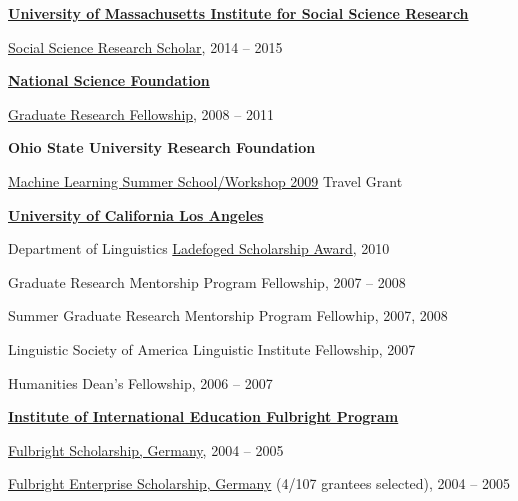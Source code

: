 \documentclass[10pt]{article}
\newcommand{\halfblankline}{\quad\vspace{-0.5\baselineskip}\pagebreak[3]}
\begin{document}
\halfblankline

\href{http://www.umass.edu/issr/index.php}{\textbf{University of Massachusetts
    Institute for Social Science Research}}
\begin{innerlist}
\item \href{http://www.umass.edu/issr/scholars/}
           {Social Science Research Scholar}, 2014 -- 2015
\end{innerlist}

\halfblankline

\href{http://www.nsf.gov/}{\textbf{National Science Foundation}}
\begin{innerlist}
\item \href{http://www.nsf.gov/grfp}
           {Graduate Research Fellowship}, 2008 -- 2011
\end{innerlist}

\halfblankline

\textbf{Ohio State University Research Foundation}
\begin{innerlist}
\item \href{http://www.cse.ohio-state.edu/mlss09/}{Machine Learning Summer School/Workshop 2009} Travel Grant
\end{innerlist}

\halfblankline

\href{http://www.ucla.edu}{\textbf{University of California Los Angeles}}
\begin{innerlist}
\item Department of Linguistics \href{http://www.linguistics.ucla.edu/general/LadefogedScholarship/}{Ladefoged Scholarship Award}, 2010
\item Graduate Research Mentorship Program Fellowship, 2007 -- 2008
\item Summer Graduate Research Mentorship Program Fellowhip, 2007, 2008
\item Linguistic Society of America Linguistic Institute Fellowship, 2007
\item Humanities Dean's Fellowship, 2006 -- 2007
\end{innerlist}

\halfblankline

\href{http://www.iie.org/fulbright}{\textbf{Institute of International
    Education Fulbright Program}}
\begin{innerlist}
\item \href{http://www.fulbright.de/togermany/}
           {Fulbright Scholarship, Germany}, 2004 -- 2005
\item \href{http://www.fulbright.de/togermany/}
           {Fulbright Enterprise Scholarship, Germany} (4/107 grantees
           selected), 2004 -- 2005
\end{innerlist}
\end{document}
